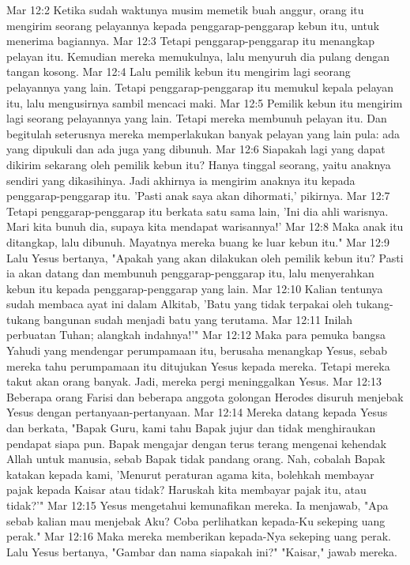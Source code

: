 Mar 12:2  Ketika sudah waktunya musim memetik buah anggur, orang itu mengirim seorang pelayannya kepada penggarap-penggarap kebun itu, untuk menerima bagiannya.
Mar 12:3  Tetapi penggarap-penggarap itu menangkap pelayan itu. Kemudian mereka memukulnya, lalu menyuruh dia pulang dengan tangan kosong.
Mar 12:4  Lalu pemilik kebun itu mengirim lagi seorang pelayannya yang lain. Tetapi penggarap-penggarap itu memukul kepala pelayan itu, lalu mengusirnya sambil mencaci maki.
Mar 12:5  Pemilik kebun itu mengirim lagi seorang pelayannya yang lain. Tetapi mereka membunuh pelayan itu. Dan begitulah seterusnya mereka memperlakukan banyak pelayan yang lain pula: ada yang dipukuli dan ada juga yang dibunuh.
Mar 12:6  Siapakah lagi yang dapat dikirim sekarang oleh pemilik kebun itu? Hanya tinggal seorang, yaitu anaknya sendiri yang dikasihinya. Jadi akhirnya ia mengirim anaknya itu kepada penggarap-penggarap itu. 'Pasti anak saya akan dihormati,' pikirnya.
Mar 12:7  Tetapi penggarap-penggarap itu berkata satu sama lain, 'Ini dia ahli warisnya. Mari kita bunuh dia, supaya kita mendapat warisannya!'
Mar 12:8  Maka anak itu ditangkap, lalu dibunuh. Mayatnya mereka buang ke luar kebun itu."
Mar 12:9  Lalu Yesus bertanya, "Apakah yang akan dilakukan oleh pemilik kebun itu? Pasti ia akan datang dan membunuh penggarap-penggarap itu, lalu menyerahkan kebun itu kepada penggarap-penggarap yang lain.
Mar 12:10  Kalian tentunya sudah membaca ayat ini dalam Alkitab, 'Batu yang tidak terpakai oleh tukang-tukang bangunan sudah menjadi batu yang terutama.
Mar 12:11  Inilah perbuatan Tuhan; alangkah indahnya!'"
Mar 12:12  Maka para pemuka bangsa Yahudi yang mendengar perumpamaan itu, berusaha menangkap Yesus, sebab mereka tahu perumpamaan itu ditujukan Yesus kepada mereka. Tetapi mereka takut akan orang banyak. Jadi, mereka pergi meninggalkan Yesus.
Mar 12:13  Beberapa orang Farisi dan beberapa anggota golongan Herodes disuruh menjebak Yesus dengan pertanyaan-pertanyaan.
Mar 12:14  Mereka datang kepada Yesus dan berkata, "Bapak Guru, kami tahu Bapak jujur dan tidak menghiraukan pendapat siapa pun. Bapak mengajar dengan terus terang mengenai kehendak Allah untuk manusia, sebab Bapak tidak pandang orang. Nah, cobalah Bapak katakan kepada kami, 'Menurut peraturan agama kita, bolehkah membayar pajak kepada Kaisar atau tidak? Haruskah kita membayar pajak itu, atau tidak?'"
Mar 12:15  Yesus mengetahui kemunafikan mereka. Ia menjawab, "Apa sebab kalian mau menjebak Aku? Coba perlihatkan kepada-Ku sekeping uang perak."
Mar 12:16  Maka mereka memberikan kepada-Nya sekeping uang perak. Lalu Yesus bertanya, "Gambar dan nama siapakah ini?" "Kaisar," jawab mereka.
